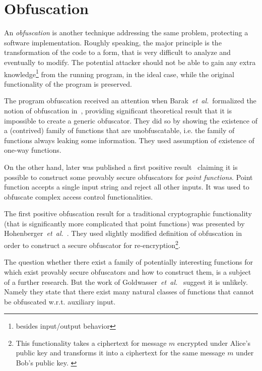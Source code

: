 \documentclass[11pt,oneside,final]{fithesis2}
\newcommand{\eal}{\emph{et~al.}}
\begin{document}
    \section{Obfuscation}\label{sec:obfuscation}
    An \emph{obfuscation} is another technique addressing the same problem, protecting a software implementation. 
    Roughly speaking, the major principle is the transformation of the code to a form, that is very difficult 
    to analyze and eventually to modify. The potential attacker should not be able to gain any extra knowledge\footnote{besides input/output behavior} 
    from the running program, in the ideal case, while the original functionality of the program is preserved.

    The program obfuscation received an attention when Barak~\eal\ formalized the notion of obfuscation
    in~\citep{Barak:2012:POP:2160158.2160159}, providing significant theoretical result
    that it is impossible to create a generic obfuscator. They did so by showing the existence of a (contrived) family of functions that 
    are unobfuscatable, i.e. the family of functions always leaking some information. They used assumption of existence of one-way functions.

    On the other hand,
    later was published a first positive result~\citep{Lynn04positiveresults} claiming it is possible to construct some provably 
    secure obfuscators for \emph{point functions}. Point function accepts a single input string and reject all other inputs. 
    It was used to obfuscate complex access control functionalities.
    
    The first positive obfuscation result for a traditional cryptographic functionality (that is significantly more complicated that point functions)
    was presented by Hohenberger~\eal~\citep{Hohenberger:2007:SOR:1760749.1760767}.
    They used slightly modified definition of obfuscation in order to construct a secure obfuscator for 
    re-encryption\footnote{This functionality takes a ciphertext for message $m$ encrypted under Alice’s public key and transforms it into a 
    ciphertext for the same message $m$ under Bob’s public key. \citep{Hohenberger:2007:SOR:1760749.1760767}}.

    The question whether there exist a family of potentially interesting functions for which exist provably secure obfuscators and how to construct them,
    is a subject of a further research. But the work of Goldwasser~\eal~\citep{Goldwasser:2005:IOA:1097112.1097490} suggest it is unlikely. 
    Namely they state that there exist many natural classes of functions that cannot be obfuscated w.r.t. auxiliary input.
\end{document}
